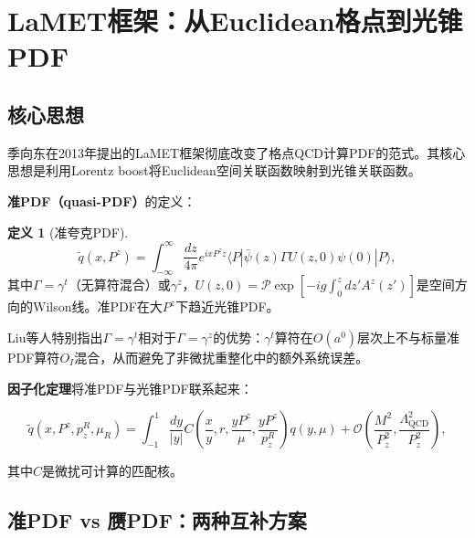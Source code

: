 \documentclass[12pt,a4paper]{ctexart}
\theoremstyle{definition}
\newtheorem{definition}{定义}[section]
\begin{document}
\section{LaMET框架：从Euclidean格点到光锥PDF}

\subsection{核心思想}

季向东在2013年提出的LaMET框架\cite{Ji2013Euclidean,Ji2014LaMET}彻底改变了格点QCD计算PDF的范式。其核心思想是利用Lorentz boost将Euclidean空间关联函数映射到光锥关联函数。

\textbf{准PDF（quasi-PDF）}的定义\cite{Ji2013Euclidean,Liu2019isovector}：

\begin{definition}[准夸克PDF]
\begin{equation}
\boxed{\tilde{q}(x, P^z) = \int_{-\infty}^{\infty} \frac{dz}{4\pi} e^{ixP^z z} \langle P| \bar{\psi}(z) \Gamma U(z, 0) \psi(0) |P\rangle},
\label{eq:quasi_pdf}
\end{equation}
其中$\Gamma = \gamma^t$（无算符混合）或$\gamma^z$，$U(z,0) = \mathcal{P}\exp[-ig\int_0^z dz' A^z(z')]$是空间方向的Wilson线。准PDF在大$P^z$下趋近光锥PDF。
\end{definition}

Liu等人\cite{Liu2019isovector}特别指出$\Gamma = \gamma^t$相对于$\Gamma = \gamma^z$的优势：$\gamma^t$算符在$O(a^0)$层次上不与标量准PDF算符$O_I$混合，从而避免了非微扰重整化中的额外系统误差。

\textbf{因子化定理}\cite{Izubuchi2018}将准PDF与光锥PDF联系起来：

\begin{equation}
\boxed{\tilde{q}(x, P^z, p^R_z, \mu_R) = \int_{-1}^{1} \frac{dy}{|y|} C\left(\frac{x}{y}, r, \frac{yP^z}{\mu}, \frac{yP^z}{p^R_z}\right) q(y, \mu) + \mathcal{O}\left(\frac{M^2}{P_z^2}, \frac{\Lambda^2_{\text{QCD}}}{P_z^2}\right)},
\label{eq:factorization}
\end{equation}

其中$C$是微扰可计算的匹配核。

\subsection{准PDF vs 赝PDF：两种互补方案}
\end{document}
